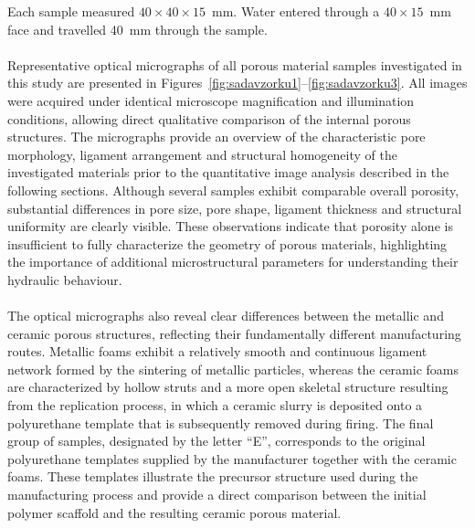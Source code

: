 \documentclass[a4paper]{article}
\begin{document}
Each sample measured $40\times40\times15$~mm. Water entered through a $40\times15$~mm face and travelled 40~mm through the sample.
\\
\\
Representative optical micrographs of all porous material samples investigated in this study are presented in Figures~\ref{fig:sadavzorku1}--\ref{fig:sadavzorku3}. All images were acquired under identical microscope magnification and illumination conditions, allowing direct qualitative comparison of the internal porous structures. The micrographs provide an overview of the characteristic pore morphology, ligament arrangement and structural homogeneity of the investigated materials prior to the quantitative image analysis described in the following sections. Although several samples exhibit comparable overall porosity, substantial differences in pore size, pore shape, ligament thickness and structural uniformity are clearly visible. These observations indicate that porosity alone is insufficient to fully characterize the geometry of porous materials, highlighting the importance of additional microstructural parameters for understanding their hydraulic behaviour.
\\
\\
The optical micrographs also reveal clear differences between the metallic and ceramic porous structures, reflecting their fundamentally different manufacturing routes. Metallic foams exhibit a relatively smooth and continuous ligament network formed by the sintering of metallic particles, whereas the ceramic foams are characterized by hollow struts and a more open skeletal structure resulting from the replication process, in which a ceramic slurry is deposited onto a polyurethane template that is subsequently removed during firing. The final group of samples, designated by the letter ``E'', corresponds to the original polyurethane templates supplied by the manufacturer together with the ceramic foams. These templates illustrate the precursor structure used during the manufacturing process and provide a direct comparison between the initial polymer scaffold and the resulting ceramic porous material.
\end{document}
